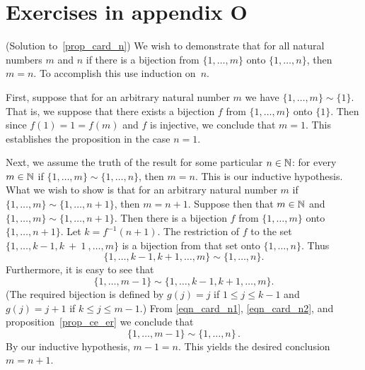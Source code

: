 \section{Exercises in appendix O}

\begin{prf}\label{sol_prop_card_n}(Solution to~\ref{prop_card_n})
We wish to demonstrate that for all natural numbers $m$ and $n$ if there is a bijection from
$\{1,\dots, m\}$ onto $\{1,\dots, n\}$, then $m = n$.  To accomplish this use induction
on~$n$.

First, suppose that for an arbitrary natural number $m$ we have $\{1,\dots, m\} \sim \{1\}$.
That is, we suppose that there exists a bijection $f$ from $\{1, \dots, m\}$ onto $\{1\}$.
Then since $f(1) = 1 = f(m)$ and $f$ is injective, we conclude that $m = 1$. This establishes
the proposition in the case $n = 1$.

Next, we assume the truth of the result for some particular $n \in \mathbb{N}$: for every $m \in \mathbb{N}$
if $\{1,\dots, m\} \sim \{1,\dots, n\}$, then $m = n$.  This is our inductive hypothesis. What
we wish to show is that for an arbitrary natural number $m$ if $\{1,\dots, m\} \sim \{1,\dots,
n+1\}$, then $m = n+1$.  Suppose then that $m \in \mathbb{N}$ and $\{1,\dots, m\} \sim
\{1,\dots,n+1\}$. Then there is a bijection $f$ from $\{1,\dots,m\}$ onto $\{1,\dots,n + 1\}$.
Let $k = f^{-1}(n + 1)$. The restriction of $f$ to the set $\{1,\dots,k - 1,k~+~1~, \dots,m\}$
is a bijection from that set onto $\{1,\dots,n\}$. Thus
  \begin{equation}\label{eqn_card_n1}
         \{1,\dots,k - 1,k + 1,\dots,m\} \sim \{1,\dots,n\}.
  \end{equation}
Furthermore, it is easy to see that
  \begin{equation}\label{eqn_card_n2}
         \{1,\dots,m - 1\} \sim \{1,\dots,k - 1,k + 1,\dots,m\}.
  \end{equation}
(The required bijection is defined by $g(j) = j$ if $1 \le j \le k - 1$ and $g(j) = j + 1$ if
$k \le j \le m - 1$.) From \eqref{eqn_card_n1}, \eqref{eqn_card_n2}, and
proposition~\ref{prop_ce_er} we conclude that
  \[ \{1,\dots,m-1\} \sim \{1,\dots,n\}\,. \]
By our inductive hypothesis, $m - 1 = n$. This yields the desired conclusion $m = n + 1$.
\end{prf}

